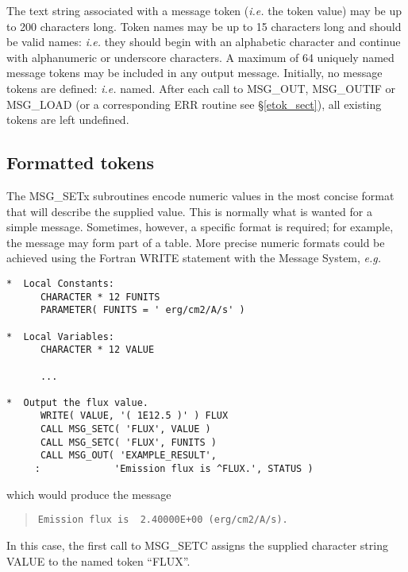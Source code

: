 The text string associated with a message token ({\em i.e.} the token value)
may be up to 200 characters long.
Token names may be up to 15 characters long and should be valid names:
{\em i.e.} they should begin with an alphabetic character and continue with
alphanumeric or underscore characters.
A maximum of 64 uniquely named message tokens may be included in any output
message. 
Initially, no message tokens are defined: {\em i.e.} named.
After each call to MSG\_OUT, MSG\_OUTIF or MSG\_LOAD (or a corresponding ERR
routine see \S\ref{etok_sect}), all existing tokens are left undefined. 


\subsection {Formatted tokens}

The MSG\_SETx subroutines encode numeric values in the most concise format
that will describe the supplied value. 
This is normally what is wanted for a simple message. 
Sometimes, however, a specific format is required; for example, the message
may form part of a table. 
More precise numeric formats could be achieved using the Fortran WRITE
statement with the Message System, {\em e.g.}

\begin {small}
\begin{verbatim}
*  Local Constants:
      CHARACTER * 12 FUNITS
      PARAMETER( FUNITS = ' erg/cm2/A/s' )

*  Local Variables:
      CHARACTER * 12 VALUE

      ...

*  Output the flux value.
      WRITE( VALUE, '( 1E12.5 )' ) FLUX
      CALL MSG_SETC( 'FLUX', VALUE )
      CALL MSG_SETC( 'FLUX', FUNITS )
      CALL MSG_OUT( 'EXAMPLE_RESULT', 
     :             'Emission flux is ^FLUX.', STATUS )
\end{verbatim}
\end {small}

which would produce the message

\begin {quote}
\begin {small}
\begin{verbatim}
Emission flux is  2.40000E+00 (erg/cm2/A/s).
\end{verbatim}
\end {small}
\end {quote}

In this case, the first call to MSG\_SETC assigns the supplied character 
string VALUE to the named token ``FLUX''.

